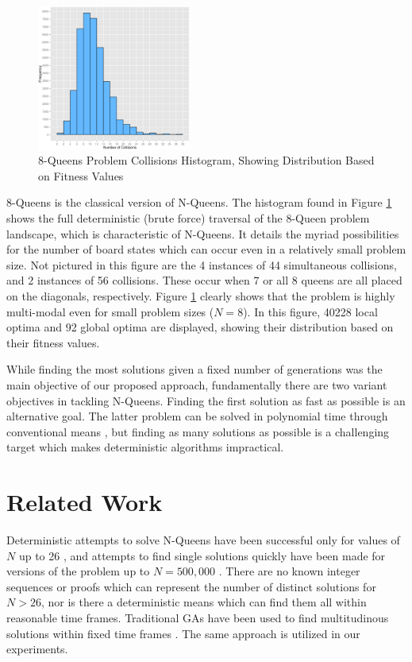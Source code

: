 \documentclass[conference]{IEEEtran}
\begin{document}
\begin{figure}[h!]
\centerline{\includegraphics[width=0.45\textwidth]{figures/8_queens_histogram.png}}
\caption{8-Queens Problem Collisions Histogram, Showing Distribution Based on Fitness Values}
\label{fig:histogram}
\end{figure}

8-Queens is the classical version of N-Queens. The histogram found in Figure \ref{fig:histogram} shows the full deterministic (brute force) traversal of the 8-Queen problem landscape, which is characteristic of N-Queens. It details the myriad possibilities for the number of board states which can occur even in a relatively small problem size. Not pictured in this figure are the 4 instances of 44 simultaneous collisions, and 2 instances of 56 collisions. These occur when 7 or all 8 queens are all placed on the diagonals, respectively. Figure \ref{fig:histogram} clearly shows that the problem is highly multi-modal even for small problem sizes ($N = 8$). In this figure, 40228 local optima and 92 global optima are displayed, showing their distribution based on their fitness values.

While finding the most solutions given a fixed number of generations was the main objective of our proposed approach, fundamentally there are two variant objectives in tackling N-Queens. Finding the first solution as fast as possible is an alternative goal. The latter problem can be solved in polynomial time through conventional means \cite{cit:22,cit:23}, but finding as many solutions as possible is a challenging target which makes deterministic algorithms impractical.

\section{Related Work}
Deterministic attempts to solve N-Queens have been successful only for values of $N$ up to 26 \cite{cit:20,cit:24}, and attempts to find single solutions quickly have been made for versions of the problem up to {$N = 500,000$} \cite{cit:21}. There are no known integer sequences or proofs which can represent the number of distinct solutions for $N > 26$, nor is there a deterministic means which can find them all within reasonable time frames. Traditional GAs have been used to find multitudinous solutions within fixed time frames \cite{cit:9,cit:10}. The same approach is utilized in our experiments.
\end{document}
